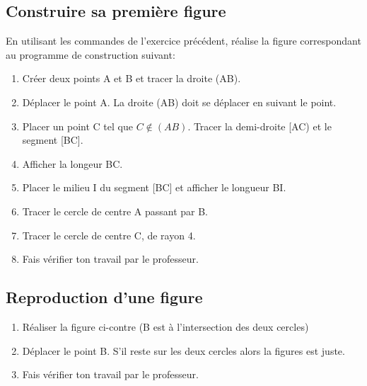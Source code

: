 \begin{activite}
	\subsection{Construire sa première figure}
En utilisant les commandes de l'exercice précédent, réalise la figure correspondant au programme de construction suivant:
\begin{enumerate}
\item Créer deux points A et B et tracer la droite (AB).
\item Déplacer le point A. La droite (AB) doit se déplacer en suivant le point.
\item Placer un point C tel que $C \notin(AB)$. Tracer la demi-droite [AC) et le segment [BC].
\item Afficher la longeur BC.
\item Placer le milieu I du segment [BC] et afficher le longueur BI.
\item Tracer le cercle de centre A passant par B.
\item Tracer le cercle de centre C, de rayon 4.
\item Fais vérifier ton travail par le professeur.
\end{enumerate}

	\subsection{Reproduction d'une figure}
\begin{enumerate}
\item Réaliser la figure ci-contre (B est à l'intersection des deux cercles)
\item Déplacer le point B. S'il reste sur les deux cercles alors la figures est juste.
\item Fais vérifier ton travail par le professeur.
\end{enumerate}

\end{activite}



